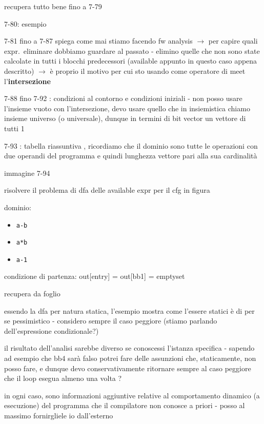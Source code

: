 recupera tutto bene fino a 7-79

7-80: esempio 

7-81 fino a 7-87 spiega come mai stiamo facendo fw analysis $\rightarrow$ per capire quali expr.~eliminare dobbiamo guardare al passato - elimino quelle che non sono state calcolate in tutti i blocchi predecessori (available appunto in questo caso appena descritto) $\rightarrow$ \`e proprio il motivo per cui sto usando come operatore di meet l'\textbf{intersezione}

7-88 fino 7-92 : condizioni al contorno e condizioni iniziali - non posso usare l'insieme vuoto con l'intersezione, devo usare quello che in insiemistica chiamo insieme universo (o universale), dunque in termini di bit vector un vettore di tutti 1

7-93 : tabella riassuntiva , ricordiamo che il dominio sono tutte le operazioni con due operandi del programma e quindi lunghezza vettore pari alla sua cardinalit\`a

\begin{example}
    immagine 7-94

    risolvere il problema di dfa delle available expr per il cfg in figura

    dominio:
    \begin{itemize}
      \item \lstinline|a-b|
      \item \lstinline|a*b|
      \item \lstinline|a-1|
    \end{itemize}
    
    condizione di partenza: out[entry] = out[bb1] = emptyset

    recupera da foglio

\end{example}

essendo la dfa per natura statica, l'esempio mostra come l'essere statici \`e di per se pessimistico - considero sempre il caso peggiore (stiamo parlando dell'espressione condizionale?)

il risultato dell'analisi sarebbe diverso se conoscessi l'istanza specifica - sapendo ad esempio che bb4 sar\`a falso potrei fare delle assunzioni che, staticamente, non posso fare, e dunque devo conservativamente ritornare sempre al caso peggiore che il loop esegua almeno una volta ?

in ogni caso, sono informazioni aggiuntive relative al comportamento dinamico (a esecuzione) del programma che il compilatore non conosce a priori - posso al massimo fornirgliele io dall'esterno

